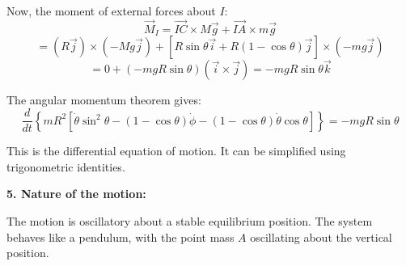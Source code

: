 \documentclass[12pt]{article}
\begin{document}
\begin{correctionbox}
Now, the moment of external forces about $I$:
$$\vec{M}_I = \vec{IC} \times M\vec{g} + \vec{IA} \times m\vec{g}$$
$$= (R\vec{j}) \times (-Mg\vec{j}) + [R\sin\theta\vec{i} + R(1 - \cos\theta)\vec{j}] \times (-mg\vec{j})$$
$$= 0 + (-mgR\sin\theta)(\vec{i} \times \vec{j}) = -mgR\sin\theta\vec{k}$$

The angular momentum theorem gives:
$$\frac{d}{dt}\left\{mR^2[\dot{\theta}\sin^2\theta - (1 - \cos\theta)\dot{\phi} - (1 - \cos\theta)\dot{\theta}\cos\theta]\right\} = -mgR\sin\theta$$

This is the differential equation of motion. It can be simplified using trigonometric identities.

\textbf{5. Nature of the motion:}

The motion is oscillatory about a stable equilibrium position. The system behaves like a pendulum, with the point mass $A$ oscillating about the vertical position.
\end{correctionbox}
\end{document}
